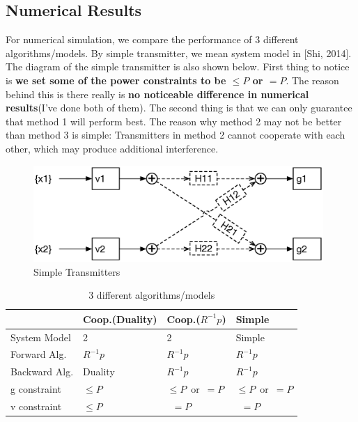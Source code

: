 \documentclass[11pt, oneside]{article}   	%
\begin{document}
\subsection{Numerical Results}
For numerical simulation, we compare the performance of 3 different algorithms/models. By simple transmitter, we mean system model in [Shi, 2014]. The diagram of the simple transmitter is also shown below. First thing to notice is \textbf{we set some of the power constraints to be $\leq P$ or $= P$}. The reason behind this is there really is \textbf{no noticeable difference in numerical results}(I've done both of them). The second thing is that we can only guarantee that method 1 will perform best. The reason why method 2 may not be better than method 3 is simple: Transmitters in method 2 cannot cooperate with each other, which may produce additional interference. 

 \begin{figure}[h]
    \centering
    \centerline{\includegraphics[width=110mm]{forward_channel_4}}
    \caption{Simple Transmitters}
\end{figure} 



\begin{table}[h!]
\centering
\begin{tabular}{ |p{3cm}||p{3cm}|p{3cm}|p{3cm}|  }
 \hline
& Coop.(Duality) &Coop.($R^{-1}p$)&Simple\\
 \hline
 System Model   & 2   &2&   Simple\\
 Forward Alg.      &  $R^{-1}p$  & $R^{-1}p$ &$R^{-1}p$\\
 Backward Alg.   &Duality & $R^{-1}p$&  $R^{-1}p$\\ 
 g constraint      &$\leq P$& $\leq P$\ or\ $= P$&  $\leq P$\ or\ $= P$\\ 
 v constraint       &$\leq P$ & \ $= P$& \ $= P$\\ 
 \hline
\end{tabular}
\caption{3 different algorithms/models}
\end{table}


\newpage
\end{document}
